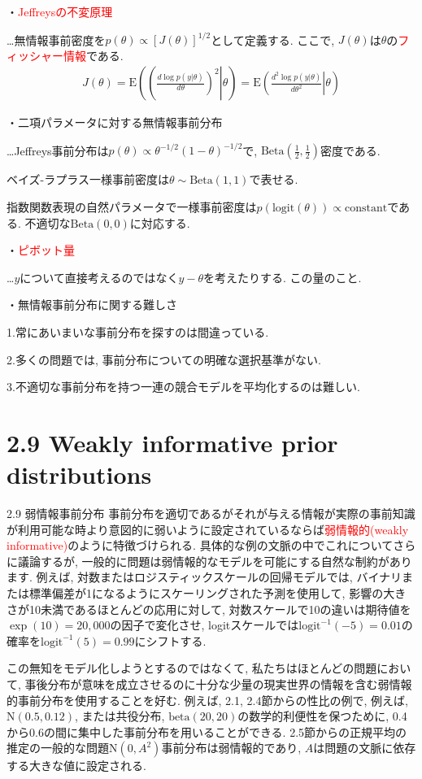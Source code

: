 \documentclass[10pt,dvipdfmx,a4]{beamer}
\newcommand{\eqn}[1]{\begin{align*}#1\end{align*}}
\newcommand{\tcr}[1]{\textcolor{red}{#1}}
\begin{document}
\begin{frame}[t]

・\tcr{Jeffreysの不変原理}

…無情報事前密度を$p(\theta)\propto[J(\theta)]^{1/2}$として定義する.
ここで, $J(\theta)$は$\theta$の\tcr{フィッシャー情報}である.
\eqn{J(\theta)=\text{E}\left(\left(\left. \tfrac{d\log p(y|\theta)}{d\theta}\right)^2\right|\theta\right)=\text{E}\left(\left.\tfrac{d^2\log p(y|\theta)}{d\theta^2}\right|\theta\right)}

・二項パラメータに対する無情報事前分布

…Jeffreys事前分布は$p(\theta)\propto\theta^{-1/2}(1-\theta)^{-1/2}$で, $\text{Beta}(\tfrac{1}{2},\tfrac{1}{2})$密度である.

ベイズ-ラプラス一様事前密度は$\theta\sim\text{Beta}(1,1)$で表せる.

指数関数表現の自然パラメータで一様事前密度は$p(\text{logit}(\theta))\propto\text{constant}$である.
不適切な$\text{Beta}(0,0)$に対応する.

・\tcr{ピボット量}

…$y$について直接考えるのではなく$y-\theta$を考えたりする.
この量のこと.

・無情報事前分布に関する難しさ

1.常にあいまいな事前分布を探すのは間違っている.

2.多くの問題では, 事前分布についての明確な選択基準がない.

3.不適切な事前分布を持つ一連の競合モデルを平均化するのは難しい.
\end{frame}


\section{2.9 Weakly informative prior distributions}
\begin{frame}{2.9 弱情報事前分布}
事前分布を適切であるがそれが与える情報が実際の事前知識が利用可能な時より意図的に弱いように設定されているならば\tcr{弱情報的(weakly informative)}のように特徴づけられる.
具体的な例の文脈の中でこれについてさらに議論するが, 一般的に問題は弱情報的なモデルを可能にする自然な制約があります.
例えば, 対数またはロジスティックスケールの回帰モデルでは, バイナリまたは標準偏差が1になるようにスケーリングされた予測を使用して, 影響の大きさが10未満であるほとんどの応用に対して, 対数スケールで10の違いは期待値を$\exp(10)= 20,000$の因子で変化させ, logitスケールでは$\text{logit}^{-1}(-5)= 0.01$の確率を$\text{logit}^{-1}(5)= 0.99$にシフトする.

この無知をモデル化しようとするのではなくて, 私たちはほとんどの問題において, 事後分布が意味を成立させるのに十分な少量の現実世界の情報を含む弱情報的事前分布を使用することを好む.
例えば, 2.1, 2.4節からの性比の例で, 例えば, $\text{N}(0.5,0.12)$, または共役分布, $\text{beta}(20,20)$の数学的利便性を保つために, 0.4から0.6の間に集中した事前分布を用いることができる.
2.5節からの正規平均の推定の一般的な問題$\text{N}(0,A^2)$事前分布は弱情報的であり, $A$は問題の文脈に依存する大きな値に設定される.
\end{frame}
\end{document}
